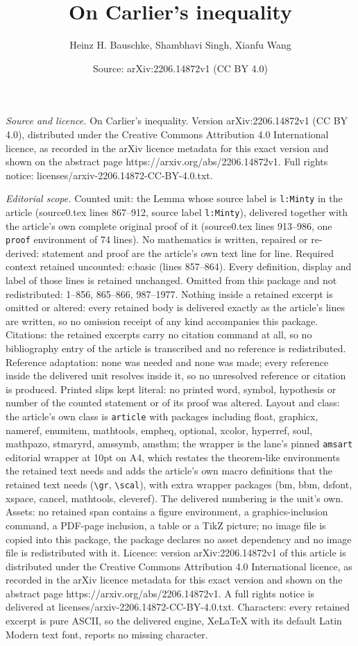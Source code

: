 \documentclass[10pt,a4paper]{amsart}
\title[On Carlier's inequality]{On Carlier's inequality}
\author{Heinz H. Bauschke, Shambhavi Singh, Xianfu Wang}
\date{Source: arXiv:2206.14872v1 (CC BY 4.0)}
\begin{document}
\maketitle

\noindent\emph{Source and licence.} On Carlier's inequality. Version arXiv:2206.14872v1 (CC BY 4.0), distributed under the Creative Commons Attribution 4.0 International licence, as recorded in the arXiv licence metadata for this exact version and shown on the abstract page https://arxiv.org/abs/2206.14872v1. Full rights notice: licenses/arxiv-2206.14872-CC-BY-4.0.txt.\par\smallskip

\noindent\textit{Editorial scope.} Counted unit: the Lemma whose source label is \texttt{l:Minty} in the article (source0.tex lines 867--912, source label \texttt{l:Minty}), delivered together with the article's own complete original proof of it (source0.tex lines 913--986, one \texttt{proof} environment of 74 lines). No mathematics is written, repaired or re-derived: statement and proof are the article's own text line for line. Required context retained uncounted: e:basic (lines 857--864). Every definition, display and label of those lines is retained unchanged. Omitted from this package and not redistributed: 1--856, 865--866, 987--1977. Nothing inside a retained excerpt is omitted or altered: every retained body is delivered exactly as the article's lines are written, so no omission receipt of any kind accompanies this package. Citations: the retained excerpts carry no citation command at all, so no bibliography entry of the article is transcribed and no reference is redistributed. Reference adaptation: none was needed and none was made; every reference inside the delivered unit resolves inside it, so no unresolved reference or citation is produced. Printed slips kept literal: no printed word, symbol, hypothesis or number of the counted statement or of its proof was altered. Layout and class: the article's own class is \texttt{article} with packages including float, graphicx, nameref, enumitem, mathtools, empheq, optional, xcolor, hyperref, soul, mathpazo, stmaryrd, amssymb, amsthm; the wrapper is the lane's pinned \texttt{amsart} editorial wrapper at 10pt on A4, which restates the theorem-like environments the retained text needs and adds the article's own macro definitions that the retained text needs (\texttt{\textbackslash gr}, \texttt{\textbackslash scal}), with extra wrapper packages (bm, bbm, dsfont, xspace, cancel, mathtools, cleveref). The delivered numbering is the unit's own. Assets: no retained span contains a figure environment, a graphics-inclusion command, a PDF-page inclusion, a table or a TikZ picture; no image file is copied into this package, the package declares no asset dependency and no image file is redistributed with it. Licence: version arXiv:2206.14872v1 of this article is distributed under the Creative Commons Attribution 4.0 International licence, as recorded in the arXiv licence metadata for this exact version and shown on the abstract page https://arxiv.org/abs/2206.14872v1. A full rights notice is delivered at licenses/arxiv-2206.14872-CC-BY-4.0.txt. Characters: every retained excerpt is pure ASCII, so the delivered engine, XeLaTeX with its default Latin Modern text font, reports no missing character.
\end{document}
